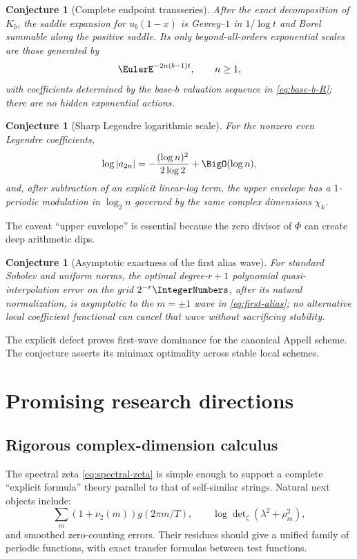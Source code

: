 \documentclass[11pt,oneside]{article}
\newtheorem{conjecture}[theorem]{Conjecture}
\theoremstyle{definition}
\theoremstyle{remark}
\begin{document}
\begin{conjecture}[Complete endpoint transseries]
\label{conj:resurgence}
After the exact decomposition of \(K_b\), the saddle expansion for
\(u_b(1-x)\) is Gevrey--\(1\) in \(1/\log t\) and Borel summable along the
positive saddle.  Its only beyond-all-orders exponential scales are those
generated by
\[
 \EulerE^{-2n(b-1)t},\qquad n\geq1,
\]
with coefficients determined by the base-\(b\) valuation sequence in
\eqref{eq:base-b-R}; there are no hidden exponential actions.
\end{conjecture}

\begin{conjecture}[Sharp Legendre logarithmic scale]
\label{conj:legendre-sharp}
For the nonzero even Legendre coefficients,
\[
 \log|a_{2n}|
 =-\frac{(\log n)^2}{2\log2}+\BigO(\log n),
\]
and, after subtraction of an explicit linear-log term, the upper envelope has
a \(1\)-periodic modulation in \(\log_2n\) governed by the same complex
dimensions \(\chi_k\).
\end{conjecture}

The caveat ``upper envelope'' is essential because the zero divisor of
\(\Phi\) can create deep arithmetic dips.

\begin{conjecture}[Asymptotic exactness of the first alias wave]
\label{conj:alias-norm}
For standard Sobolev and uniform norms, the optimal degree-\(r+1\)
polynomial quasi-interpolation error on the grid \(2^{-r}\IntegerNumbers\), after its
natural normalization, is asymptotic to the \(m=\pm1\) wave in
\eqref{eq:first-alias}; no alternative local coefficient functional can
cancel that wave without sacrificing stability.
\end{conjecture}

The explicit defect proves first-wave dominance for the canonical Appell
scheme.  The conjecture asserts its minimax optimality across stable local
schemes.

\section{Promising research directions}
\label{sec:future}

\subsection{Rigorous complex-dimension calculus}

The spectral zeta \eqref{eq:spectral-zeta} is simple enough to support a
complete ``explicit formula'' theory parallel to that of self-similar
strings.  Natural next objects include:
\[
 \sum_m(1+\nu_2(m))g(2\pi m/T),
 \qquad
 \log\det\nolimits_\zeta(\lambda^2+\rho_m^2),
\]
and smoothed zero-counting errors.  Their residues should give a unified
family of periodic functions, with exact transfer formulas between test
functions.
\end{document}
